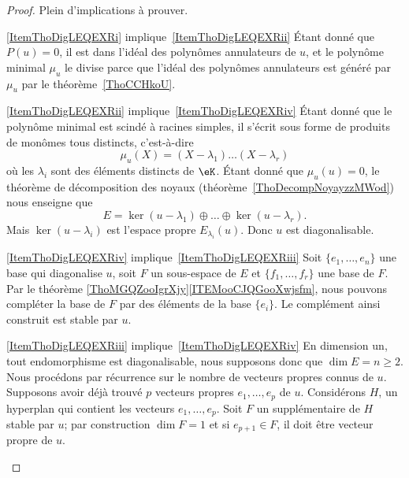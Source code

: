 \begin{proof}
	Plein d'implications à prouver.
	\begin{subproof}
		\item[\ref{ItemThoDigLEQEXRi} implique~\ref{ItemThoDigLEQEXRii}] Étant donné que \( P(u)=0\), il est dans l'idéal des polynômes annulateurs de \( u\), et le polynôme minimal \( \mu_u\) le divise parce que l'idéal des polynômes annulateurs est généré par \( \mu_u\) par le théorème~\ref{ThoCCHkoU}.

		\item[\ref{ItemThoDigLEQEXRii} implique~\ref{ItemThoDigLEQEXRiv}] Étant donné que le polynôme minimal est scindé à racines simples, il s'écrit sous forme de produits de monômes tous distincts, c'est-à-dire
		\begin{equation}
			\mu_u(X)=(X-\lambda_1)\ldots(X-\lambda_r)
		\end{equation}
		où les \( \lambda_i\) sont des éléments distincts de \( \eK\). Étant donné que \( \mu_u(u)=0\), le théorème de décomposition des noyaux (théorème~\ref{ThoDecompNoyayzzMWod}) nous enseigne que
		\begin{equation}
			E=\ker(u-\lambda_1)\oplus\ldots\oplus\ker(u-\lambda_r).
		\end{equation}
		Mais \( \ker(u-\lambda_i)\) est l'espace propre \( E_{\lambda_i}(u)\). Donc \( u\) est diagonalisable.

		\item[\ref{ItemThoDigLEQEXRiv} implique~\ref{ItemThoDigLEQEXRiii}] Soit \( \{ e_1,\ldots, e_n \}\) une base qui diagonalise \( u\), soit \( F\) un sous-espace de \( E\) et \( \{ f_1,\ldots, f_r \}\) une base de \( F\). Par le théorème \ref{ThoMGQZooIgrXjy}\ref{ITEMooCJQGooXwjsfm}, nous pouvons compléter la base de \( F\) par des éléments de la base \( \{ e_i \}\). Le complément ainsi construit est stable par \( u\).

		\item[\ref{ItemThoDigLEQEXRiii} implique~\ref{ItemThoDigLEQEXRiv}] En dimension un, tout endomorphisme est diagonalisable, nous supposons donc que \( \dim E=n\geq 2\). Nous procédons par récurrence sur le nombre de vecteurs propres connus de \( u\). Supposons avoir déjà trouvé \( p\) vecteurs propres \( e_1,\ldots, e_p\) de \( u\). Considérons \( H\), un hyperplan qui contient les vecteurs \( e_1,\ldots, e_p\). Soit \( F\) un supplémentaire de \( H\) stable par \( u\); par construction \( \dim F=1\) et si \( e_{p+1}\in F\), il doit être vecteur propre de \( u\).


\end{subproof}
\end{proof}

